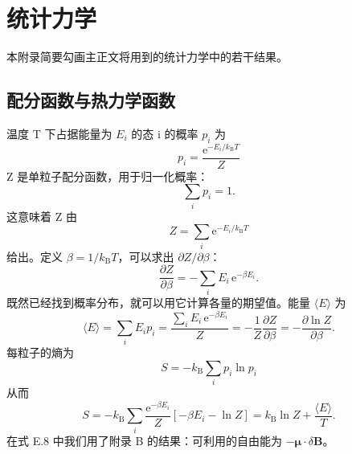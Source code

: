 \chapter{统计力学}

本附录简要勾画主正文将用到的统计力学中的若干结果。

\section{配分函数与热力学函数}

温度 T 下占据能量为 $E_i$ 的态 i 的概率 $p_i$ 为
\begin{equation*}
p_i = \frac{\mathrm{e}^{-E_i/k_{\mathrm{B}}T}}{Z}\tag{E.1}
\end{equation*}
Z 是单粒子配分函数，用于归一化概率：
\begin{equation*}
\sum_ip_i = 1.\tag{E.2}
\end{equation*}
这意味着 Z 由
\begin{equation*}
Z = \sum_i\mathrm{e}^{-E_i/k_{\mathrm{B}}T}\tag{E.3}
\end{equation*}
给出。定义 $\beta=1/k_{\mathrm{B}}T$，可以求出 $\partial Z/\partial\beta$：
\begin{equation*}
\frac{\partial Z}{\partial\beta} = -\sum_iE_i\,\mathrm{e}^{-\beta E_i}.\tag{E.4}
\end{equation*}
既然已经找到概率分布，就可以用它计算各量的期望值。能量 $\langle E\rangle$ 为
\begin{equation*}
\langle E\rangle = \sum_iE_ip_i = \frac{\sum_iE_i\,\mathrm{e}^{-\beta E_i}}{Z} = -\frac{1}{Z}\frac{\partial Z}{\partial\beta} = -\frac{\partial\ln Z}{\partial\beta}.\tag{E.5}
\end{equation*}
每粒子的熵为
\begin{equation*}
S = -k_{\mathrm{B}}\sum_ip_i\ln p_i\tag{E.6}
\end{equation*}
从而
\begin{equation*}
S = -k_{\mathrm{B}}\sum_i\frac{\mathrm{e}^{-\beta E_i}}{Z}[-\beta E_i-\ln Z] = k_{\mathrm{B}}\ln Z + \frac{\langle E\rangle}{T}.\tag{E.7}
\end{equation*}
在式 E.8 中我们用了附录 B 的结果：可利用的自由能为 $-\boldsymbol{\mu}\cdot\delta\mathbf{B}$。

